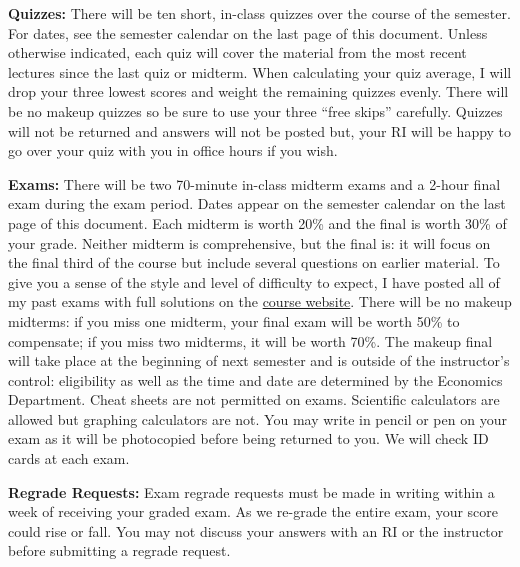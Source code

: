 \documentclass[11pt, letterpaper]{article}
\begin{document}
\noindent \textbf{Quizzes:} 
There will be ten short, in-class quizzes over the course of the semester.
For dates, see the semester calendar on the last page of this document.
Unless otherwise indicated, each quiz will cover the material from the most recent lectures since the last quiz or midterm.
When calculating your quiz average, I will drop your three lowest scores and weight the remaining quizzes evenly. 
There will be no makeup quizzes so be sure to use your three ``free skips'' carefully.
Quizzes will not be returned and answers will not be posted but, your RI will be happy to go over your quiz with you in office hours if you wish. 

\medskip

\noindent \textbf{Exams:} 
There will be two 70-minute in-class midterm exams and a 2-hour final exam during the exam period.
Dates appear on the semester calendar on the last page of this document. 
Each midterm is worth 20\% and the final is worth 30\% of your grade.
Neither midterm is comprehensive, but the final is: it will focus on the final third of the course but include several questions on earlier material.
To give you a sense of the style and level of difficulty to expect, I have posted all of my past exams with full solutions on the \href{http://ditraglia.com/Econ103Public}{course website}.
There will be no makeup midterms: if you miss one midterm, your final exam will be worth 50\% to compensate; if you miss two midterms, it will be worth 70\%.
The makeup final will take place at the beginning of next semester and is outside of the instructor's control: eligibility as well as the time and date are determined by the Economics Department. 
Cheat sheets are not permitted on exams.
Scientific calculators are allowed but graphing calculators are not. 
You may write in pencil or pen on your exam as it will be photocopied before being returned to you.
We will check ID cards at each exam.

\medskip

\noindent \textbf{Regrade Requests:}
Exam regrade requests must be made in writing within a week of receiving your graded exam. 
As we re-grade the entire exam, your score could rise or fall. 
You may not discuss your answers with an RI or the instructor before submitting a regrade request. 


\medskip
\end{document}
